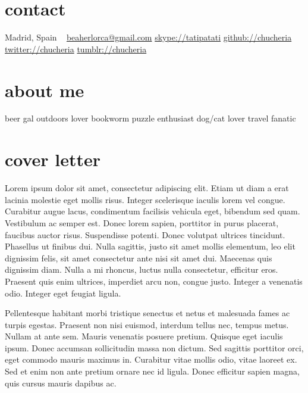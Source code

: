 \documentclass[]{friggeri-cv}
\begin{document}
\ifenglish
{}
       {}


\begin{aside}
  \section{contact}
    Madrid, Spain
    ~
    \href{mailto:beaherlorca@gmail.com}{beaherlorca@gmail.com}
    \href{skype:<tatipatati>[add]}{skype://tatipatati}
    \href{https://github.com/chucheria}{github://chucheria}
    \href{https://twitter.com/chucheria}{twitter://chucheria}
    \href{http://chucheria.tumblr.com/}{tumblr://chucheria}
  \section{about me}
    beer gal
    outdoors lover
    bookworm
    puzzle enthusiast
    dog/cat lover
    travel fanatic
\end{aside}

\section{cover letter}

    Lorem ipsum dolor sit amet, consectetur adipiscing elit. Etiam ut diam a erat lacinia molestie eget mollis risus. Integer scelerisque iaculis lorem vel congue. Curabitur augue lacus, condimentum facilisis vehicula eget, bibendum sed quam. Vestibulum ac semper est. Donec lorem sapien, porttitor in purus placerat, faucibus auctor risus. Suspendisse potenti. Donec volutpat ultrices tincidunt. Phasellus ut finibus dui. Nulla sagittis, justo sit amet mollis elementum, leo elit dignissim felis, sit amet consectetur ante nisi sit amet dui. Maecenas quis dignissim diam. Nulla a mi rhoncus, luctus nulla consectetur, efficitur eros. Praesent quis enim ultrices, imperdiet arcu non, congue justo. Integer a venenatis odio. Integer eget feugiat ligula.
    
    Pellentesque habitant morbi tristique senectus et netus et malesuada fames ac turpis egestas. Praesent non nisi euismod, interdum tellus nec, tempus metus. Nullam at ante sem. Mauris venenatis posuere pretium. Quisque eget iaculis ipsum. Donec accumsan sollicitudin massa non dictum. Sed sagittis porttitor orci, eget commodo mauris maximus in. Curabitur vitae mollis odio, vitae laoreet ex. Sed et enim non ante pretium ornare nec id ligula. Donec efficitur sapien magna, quis cursus mauris dapibus ac.
    
\end{document}
